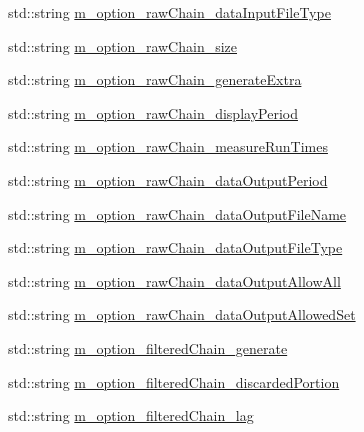 \begin{DoxyCompactItemize}
\item 
std\-::string \hyperlink{class_q_u_e_s_o_1_1_m_l_sampling_level_options_a530bd244a5f0e9ef40f9be18ec2dae49}{m\-\_\-option\-\_\-raw\-Chain\-\_\-data\-Input\-File\-Type}
\item 
std\-::string \hyperlink{class_q_u_e_s_o_1_1_m_l_sampling_level_options_a21f76f865e40198fc83406f617e396c1}{m\-\_\-option\-\_\-raw\-Chain\-\_\-size}
\item 
std\-::string \hyperlink{class_q_u_e_s_o_1_1_m_l_sampling_level_options_a775bb8dfb4e5f2a0069667586eb1b336}{m\-\_\-option\-\_\-raw\-Chain\-\_\-generate\-Extra}
\item 
std\-::string \hyperlink{class_q_u_e_s_o_1_1_m_l_sampling_level_options_ad71a6b65d66c81154cabef647419cff0}{m\-\_\-option\-\_\-raw\-Chain\-\_\-display\-Period}
\item 
std\-::string \hyperlink{class_q_u_e_s_o_1_1_m_l_sampling_level_options_a0dab337e638625987315c34660d8846e}{m\-\_\-option\-\_\-raw\-Chain\-\_\-measure\-Run\-Times}
\item 
std\-::string \hyperlink{class_q_u_e_s_o_1_1_m_l_sampling_level_options_a6fd76d8d884e3432274110a02f98086b}{m\-\_\-option\-\_\-raw\-Chain\-\_\-data\-Output\-Period}
\item 
std\-::string \hyperlink{class_q_u_e_s_o_1_1_m_l_sampling_level_options_ad1d736cccbf3be64e1998c18ead26630}{m\-\_\-option\-\_\-raw\-Chain\-\_\-data\-Output\-File\-Name}
\item 
std\-::string \hyperlink{class_q_u_e_s_o_1_1_m_l_sampling_level_options_a3cbc234ca24903ff9addc9a379bb69bf}{m\-\_\-option\-\_\-raw\-Chain\-\_\-data\-Output\-File\-Type}
\item 
std\-::string \hyperlink{class_q_u_e_s_o_1_1_m_l_sampling_level_options_a5edf0fb3329b34a79dee8d3f2187dd28}{m\-\_\-option\-\_\-raw\-Chain\-\_\-data\-Output\-Allow\-All}
\item 
std\-::string \hyperlink{class_q_u_e_s_o_1_1_m_l_sampling_level_options_ad7b34b44ea9dcfbf9092167bdb9d4ecb}{m\-\_\-option\-\_\-raw\-Chain\-\_\-data\-Output\-Allowed\-Set}
\item 
std\-::string \hyperlink{class_q_u_e_s_o_1_1_m_l_sampling_level_options_a889952cbad52c41c179ff6ffecf82dd7}{m\-\_\-option\-\_\-filtered\-Chain\-\_\-generate}
\item 
std\-::string \hyperlink{class_q_u_e_s_o_1_1_m_l_sampling_level_options_aa1d2bc1ba487c867b5ab68748f1e6c55}{m\-\_\-option\-\_\-filtered\-Chain\-\_\-discarded\-Portion}
\item 
std\-::string \hyperlink{class_q_u_e_s_o_1_1_m_l_sampling_level_options_a52e58ef7b6d840b8c6f7d505ba9cf1b2}{m\-\_\-option\-\_\-filtered\-Chain\-\_\-lag}

\end{DoxyCompactItemize}
